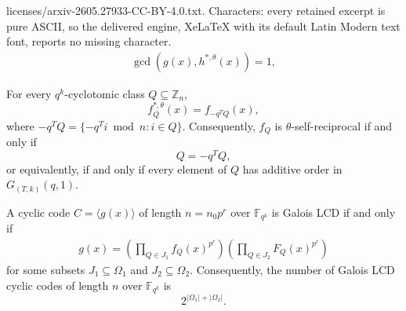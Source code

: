 \documentclass[10pt,a4paper]{amsart}
\newcommand{\F}{\mathbb{F}}
\newcommand{\Z}{\mathbb{Z}}
\begin{document}
licenses/arxiv-2605.27933-CC-BY-4.0.txt. Characters: every retained excerpt is pure ASCII, so the delivered engine, XeLaTeX with its default Latin Modern text font, reports no missing character.
\begin{align}
  \gcd(g(x),  h^{\ast,\theta}(x) )=1\label{eq-LCD},
\end{align}

\begin{theorem}\label{thm:reciprocal-coset}
For every $q^k$-cyclotomic class $Q\subseteq \Z_n$,
\[
f_Q^{\ast,\theta}(x)=f_{-q^TQ}(x),
\]
where
$
-q^TQ=\{-q^Ti \bmod n : i\in Q\}$.
Consequently, $f_Q$ is $\theta$-self-reciprocal if and only if
\[
Q=-q^TQ,
\]
or equivalently, if and only if every element of $Q$ has additive order in $G_{(T,k)}(q,1)$.
\end{theorem}

\begin{theorem}\label{thm:lcd-rr}
A cyclic code $C=\langle g(x)\rangle$ of length $n=n_0p^r$ over $\F_{q^k}$ is Galois LCD if and only if
\begin{align}\label{gen-LCD}
g(x)=
\left(\prod_{Q\in J_1} f_Q(x)^{p^r}\right)
\left(\prod_{Q\in J_2} F_Q(x)^{p^r}\right)
\end{align}
for some subsets $J_1\subseteq \Omega_1$ and $J_2\subseteq \Omega_2$. Consequently, the number of Galois LCD cyclic codes of length $n$ over $\F_{q^k}$ is
\[
2^{|\Omega_1|+|\Omega_2|}.
\]
\end{theorem}
\end{document}

